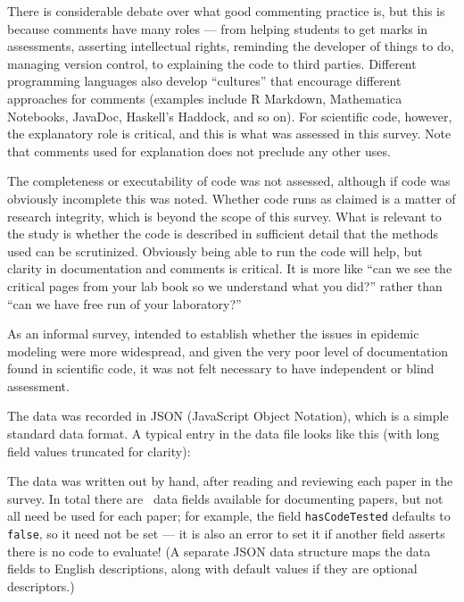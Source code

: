\documentclass{article}
\begin{document}
There is considerable debate over what good commenting practice is, but this is because comments have many roles --- from helping students to get marks in assessments, asserting intellectual rights, reminding the developer of things to do, managing version control, to explaining the code to third parties. Different programming languages also develop ``cultures'' that encourage different approaches for comments (examples include R Markdown, Mathematica Notebooks, JavaDoc, Haskell's Haddock, and so on). For scientific code, however, the explanatory role is critical, and this is what was assessed in this survey. Note that comments used for explanation does not preclude any other uses.

The completeness or executability of code was not assessed, although if code was obviously incomplete this was noted. Whether code runs as claimed is a matter of research integrity, which is beyond the scope of this survey. What is relevant to the study is whether the code is described in sufficient detail that the methods used can be scrutinized. Obviously being able to run the code will help, but clarity in documentation and comments is critical. It is more like ``can we see the critical pages from your lab book so we understand what you did?'' rather than ``can we have free run of your laboratory?''

As an informal survey, intended to establish whether the issues in epidemic modeling were more widespread, and given the very poor level of documentation found in scientific code, it was not felt necessary to have independent or blind assessment.

The data was recorded in JSON (JavaScript Object Notation), which is a simple standard data format. A typical entry in the data file looks like this (with long field values truncated for clarity):



The data was written out by hand, after reading and reviewing each paper in the survey. In total there are \countFields\ data fields available for documenting papers, but not all need be used for each paper; for example, the field \texttt{hasCodeTested} defaults to \texttt{false}, so it need not be set --- it is also an error to set it if another field asserts there is no code to evaluate! (A separate JSON data structure maps the data fields to English descriptions, along with default values if they are optional descriptors.)
\end{document}

